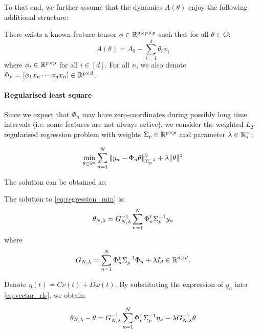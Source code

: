 \documentclass{article}
\begin{document}
To that end, we further assume that the dynamics $A(\theta)$ enjoy the following additional structure:
\begin{assumption}
\label{assumpt:linear_param}
There exists a known feature tensor $\phi\in \mathbb{R}^{d \times p \times p}$ such that for all $\theta\in\Theta$:
\begin{equation}
    A(\theta) = A_0 + %
    \sum_{i=1}^d \theta_i\phi_i
\end{equation}
where $\phi_i\in\mathbb{R}^{p\times p}$ for all $i\in[d]$. For all $n$, we also denote $\Phi_n = [\phi_1 x_n \cdots \phi_d x_n]\in\mathbb{R}^{p\times d}$.
\end{assumption}


\paragraph{Regularised least square} Since we expect that $\Phi_n$ may have zero-coordinates during possibly long time intervals (i.e. some features are not always active), we consider the weighted $L_2$-regularised regression problem with weights  $\Sigma_p\in\mathbb{R}^{p\times p}$ and parameter $\lambda\in\mathbb{R}^+_*$:


\begin{equation}
    \label{eq:regression_min}
    \min_{\theta\in\mathbb{R}^d} \sum_{n=1}^N \|y_n -\Phi_n\theta\|_{\Sigma_p^{-1}}^2 + \lambda\|\theta\|_{}^2
\end{equation}


The solution can be obtained as:

\begin{theorem}
\label{thm:regularized_solution}
The solution to \eqref{eq:regression_min} is:
\begin{equation}
    \label{eq:vector_rls}
    \theta_{N,\lambda} = G_{N, \lambda}^{-1} \sum_{n=1}^N \Phi_n^{\mathsf{\scriptscriptstyle T}} \Sigma_p^{-1} y_n
\end{equation}
where 
\begin{equation*}
    G_{N, \lambda} = \sum_{n=1}^N \Phi_{n}^{\mathsf{\scriptscriptstyle T}}\Sigma_p^{-1}\Phi_{n}  + \lambda I_d \in \mathbb{R}^{d\times d}.
\end{equation*}
\end{theorem}

Denote $\eta(t) = C\nu(t) + D\omega(t)$. By substituting the expression of $y_n$ into \eqref{eq:vector_rls}, we obtain:
\begin{lemma}
\label{lem:regression-error}
\begin{align*}
    \theta_{N,\lambda} - \theta = G_{N, \lambda}^{-1}\sum_{n=1}^N \Phi_n^{\mathsf{\scriptscriptstyle T}} \Sigma_p^{-1}\eta_n - \lambda G_{N, \lambda}^{-1}\theta 
\end{align*}
\end{lemma}
\end{document}

